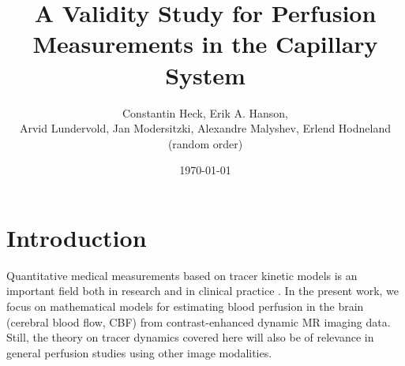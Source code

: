 \documentclass[paper=a4, fontsize=11pt,parskip=half,headings=small]{scrartcl}
\title{A Validity Study for Perfusion Measurements in the Capillary System}
\author{Constantin Heck, Erik A. Hanson, \\ Arvid Lundervold, Jan Modersitzki, Alexandre Malyshev, Erlend Hodneland \\ (random order)}
\date{\today}
\begin{document}
	\maketitle

	
	\section{Introduction}
	
	Quantitative medical measurements based on tracer kinetic models is an important field both in research and in clinical practice \cite{zierler62,axel80,zierler00}. 
	In the present work, we focus on mathematical models for estimating blood perfusion in the brain (cerebral blood flow, CBF) from contrast-enhanced dynamic MR 	imaging data. Still, the theory on tracer dynamics covered here will also be of relevance in general perfusion studies using other image modalities.
\end{document}
